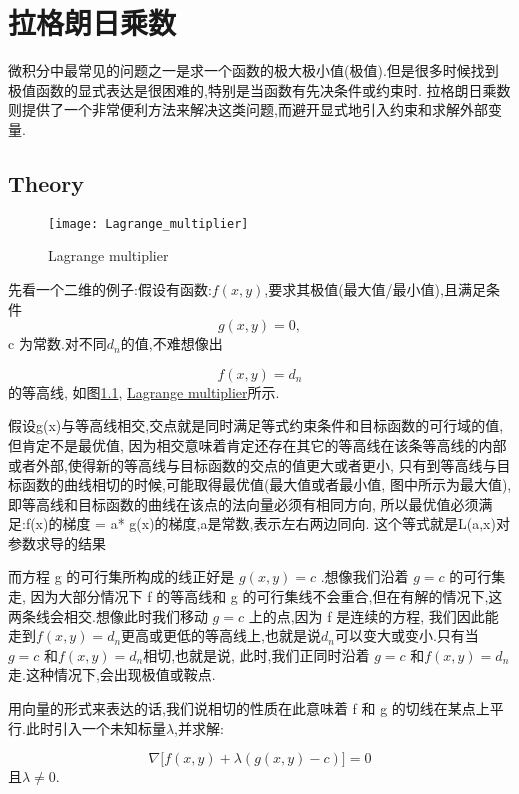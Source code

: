 \chapter{拉格朗日乘数}
微积分中最常见的问题之一是求一个函数的极大极小值(极值).但是很多时候找到极值函数的显式表达是很困难的,特别是当函数有先决条件或约束时.
拉格朗日乘数则提供了一个非常便利方法来解决这类问题,而避开显式地引入约束和求解外部变量.

\section{Theory}
\begin{figure}[htbp]
  \centering
  \texttt{[image: Lagrange\_multiplier]}\\
  \caption{Lagrange multiplier}
  \label{fig.Lagrange.multiplier}
\end{figure}

先看一个二维的例子:假设有函数:$f(x, y)$,要求其极值(最大值/最小值),且满足条件
$$ g\left( x,y \right) = 0, $$
c 为常数.对不同$d_n$的值,不难想像出

$$ f \left( x, y \right)=d_n $$
的等高线, 如图\ref{fig.Lagrange.multiplier},
\href{http://upload.wikimedia.org/wikipedia/commons/thumb/f/fa/Lagrange\_multiplier.png/300px-Lagrange\_multiplier.png}{Lagrange multiplier}所示.

假设g(x)与等高线相交,交点就是同时满足等式约束条件和目标函数的可行域的值,但肯定不是最优值,
因为相交意味着肯定还存在其它的等高线在该条等高线的内部或者外部,使得新的等高线与目标函数的交点的值更大或者更小,
只有到等高线与目标函数的曲线相切的时候,可能取得最优值(最大值或者最小值, 图中所示为最大值),
即等高线和目标函数的曲线在该点的法向量必须有相同方向,
所以最优值必须满足:f(x)的梯度 = a* g(x)的梯度,a是常数,表示左右两边同向.
这个等式就是L(a,x)对参数求导的结果

而方程 g 的可行集所构成的线正好是 $g ( x, y ) = c$ .想像我们沿着 $g = c$ 的可行集走,
因为大部分情况下 f 的等高线和 g 的可行集线不会重合,但在有解的情况下,这两条线会相交.想像此时我们移动 $g = c$ 上的点,因为 f 是连续的方程,
我们因此能走到$f \left( x, y \right)=d_n$更高或更低的等高线上,也就是说$d_n$可以变大或变小.只有当 $g = c$ 和$f \left( x, y \right)=d_n$相切,也就是说,
此时,我们正同时沿着 $g = c$ 和$f \left( x, y \right)=d_n$走.这种情况下,会出现极值或鞍点.

用向量的形式来表达的话,我们说相切的性质在此意味着 f 和 g 的切线在某点上平行.此时引入一个未知标量$\lambda$,并求解:

$$ \nabla \Big[f \left(x, y \right) + \lambda \left(g \left(x, y \right) - c \right) \Big] = 0 $$
且$\lambda \neq 0$.

